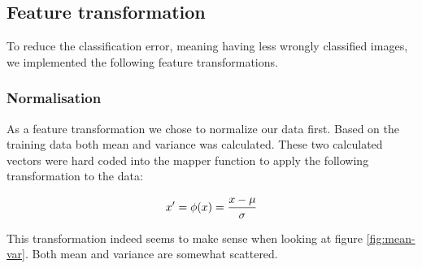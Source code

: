 \documentclass[a4paper, 11pt]{article}
\begin{document}
\subsection{Feature transformation}

To reduce the classification error, meaning having less wrongly classified
images, we implemented the following feature transformations.

\subsubsection{Normalisation}


As a feature transformation we chose to normalize our data first. Based on the
training data both mean and variance was calculated. These two calculated
vectors were hard coded into the mapper function to apply the following
transformation to the data:

$$ x' = \phi(x) = { {x - \mu} \over \sigma} $$ 

This transformation indeed seems to make sense when looking at figure
\ref{fig:mean-var}. Both mean and variance are somewhat scattered.
\end{document}
